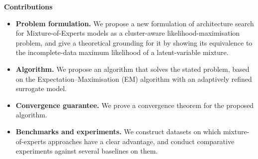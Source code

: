 \vspace{2mm}

\textbf{Contributions}

\vspace{2mm}

\begin{itemize}
    \item \textbf{Problem formulation.} We propose a new formulation of architecture search for Mixture-of-Experts models as a cluster-aware likelihood-maximisation problem, and give a theoretical grounding for it by showing its equivalence to the incomplete-data maximum likelihood of a latent-variable mixture.
    \item \textbf{Algorithm.} We propose an algorithm that solves the stated problem, based on the Expectation--Maximisation (EM) algorithm with an adaptively refined surrogate model.
    \item \textbf{Convergence guarantee.} We prove a convergence theorem for the proposed algorithm.
    \item \textbf{Benchmarks and experiments.} We construct datasets on which mixture-of-experts approaches have a clear advantage, and conduct comparative experiments against several baselines on them.
\end{itemize}